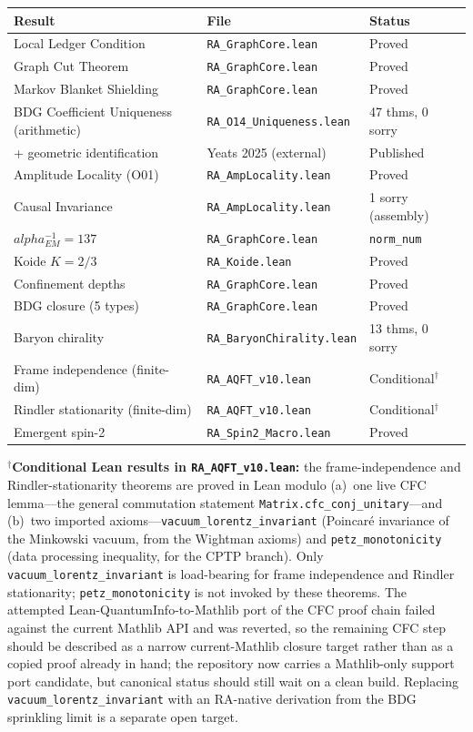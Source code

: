 \documentclass[11pt]{article}
\def\alpha{alpha}%
\def\mathrm#1{#1}%
\begin{document}
\begin{center}
\begin{tabular}{lll}
\toprule
Result & File & Status \\
\midrule
Local Ledger Condition & \texttt{RA\_GraphCore.lean} & Proved \\
Graph Cut Theorem & \texttt{RA\_GraphCore.lean} & Proved \\
Markov Blanket Shielding & \texttt{RA\_GraphCore.lean} & Proved \\
BDG Coefficient Uniqueness (arithmetic) & \texttt{RA\_O14\_Uniqueness.lean} & 47 thms, 0 sorry \\
\quad + geometric identification & Yeats 2025 (external) & Published \\
Amplitude Locality (O01) & \texttt{RA\_AmpLocality.lean} & Proved \\
Causal Invariance & \texttt{RA\_AmpLocality.lean} & 1 sorry (assembly) \\
$\alpha_{\mathrm{EM}}^{-1}=137$ & \texttt{RA\_GraphCore.lean} & \texttt{norm\_num} \\
Koide $K=2/3$ & \texttt{RA\_Koide.lean} & Proved \\
Confinement depths & \texttt{RA\_GraphCore.lean} & Proved \\
BDG closure (5 types) & \texttt{RA\_GraphCore.lean} & Proved \\
Baryon chirality & \texttt{RA\_BaryonChirality.lean} & 13 thms, 0 sorry \\
Frame independence (finite-dim) & \texttt{RA\_AQFT\_v10.lean} & Conditional$^\dagger$ \\
Rindler stationarity (finite-dim) & \texttt{RA\_AQFT\_v10.lean} & Conditional$^\dagger$ \\
Emergent spin-2 & \texttt{RA\_Spin2\_Macro.lean} & Proved \\
\bottomrule
\end{tabular}
\end{center}

\noindent$^\dagger$\textbf{Conditional Lean results in \texttt{RA\_AQFT\_v10.lean}:} the frame-independence and Rindler-stationarity theorems are proved in Lean modulo (a)~one live CFC lemma---the general commutation statement \texttt{Matrix.cfc\_conj\_unitary}---and (b)~two imported axioms---\texttt{vacuum\_lorentz\_invariant} (Poincar\'e invariance of the Minkowski vacuum, from the Wightman axioms) and \texttt{petz\_monotonicity} (data processing inequality, for the CPTP branch). Only \texttt{vacuum\_lorentz\_invariant} is load-bearing for frame independence and Rindler stationarity; \texttt{petz\_monotonicity} is not invoked by these theorems. The attempted Lean-QuantumInfo-to-Mathlib port of the CFC proof chain failed against the current Mathlib API and was reverted, so the remaining CFC step should be described as a narrow current-Mathlib closure target rather than as a copied proof already in hand; the repository now carries a Mathlib-only support port candidate, but canonical status should still wait on a clean build. Replacing \texttt{vacuum\_lorentz\_invariant} with an RA-native derivation from the BDG sprinkling limit is a separate open target.
\end{document}
